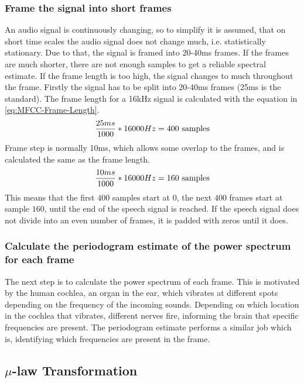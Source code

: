 \subsubsection{Frame the signal into short frames}
An audio signal is continuously changing, so to simplify it is assumed, that on short time scales the audio signal does not change much, i.e. statistically stationary. Due to that, the signal is framed into 20-40ms frames. If the frames are much shorter, there are not enough samples to get a reliable spectral estimate. If the frame length is too high, the signal changes to much throughout the frame.
\newline 
\newline
Firstly the signal has to be split into 20-40ms frames (25ms is the standard). The frame length for a 16kHz signal is calculated with the equation in \ref{eq:MFCC-Frame-Length}. 
\begin{equation}
    \centering
    \frac{25ms}{1000} * 16000Hz = 400 \ \text{samples}
    \label{eq:MFCC-Frame-Length}
\end{equation}
Frame step is normally 10ms, which allows some overlap to the frames, and is calculated the same as the frame length.
\begin{equation}
    \centering
    \frac{10ms}{1000} * 16000Hz = 160 \ \text{samples}
    \label{eq:MFCC-Frame-Step}
\end{equation}
This means that the first $400$ samples start at $0$, the next $400$ frames start at sample $160$, until the end of the speech signal is reached. If the speech signal does not divide into an even number of frames, it is padded with zeros until it does.

\subsubsection{Calculate the periodogram estimate of the power spectrum for each frame}
The next step is to calculate the power spectrum of each frame. This is motivated by the human cochlea, an organ in the ear, which vibrates at different spots depending on the frequency of the incoming sounds. Depending on which location in the cochlea that vibrates, different nerves fire, informing the brain that specific frequencies are present. The periodogram estimate performs a similar job which is, identifying which frequencies are present in the frame.

\subsection{$\mu$-law Transformation}
\label{sub:Mu-Law-Transformation}

